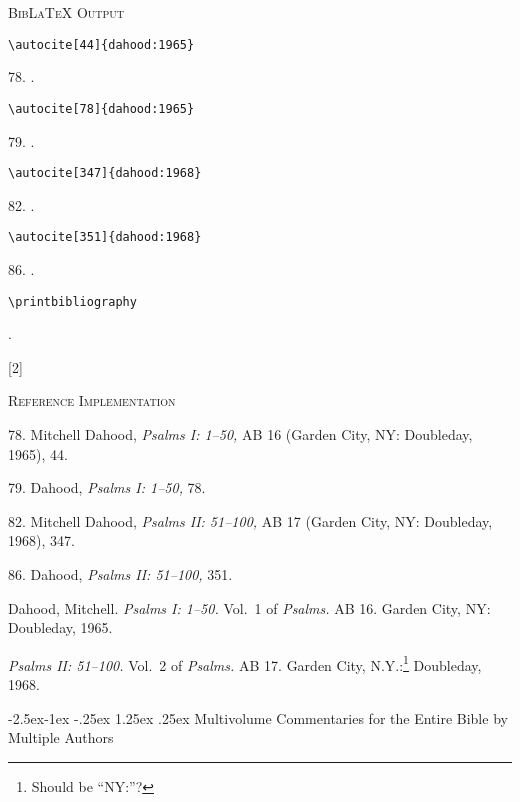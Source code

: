 \documentclass[a4paper]{article}
\makeatletter
\renewcommand\paragraph{\@startsection{paragraph}{4}{\z@}%
            {-2.5ex\@plus -1ex \@minus -.25ex}%
            {1.25ex \@plus .25ex}%
            {\normalfont\normalsize\bfseries}}
\newenvironment{refimp}{%
  \begin{minipage}{\linewidth}
    \setlength{\parskip}{1ex}
    \textsc{Reference Implementation}\par
    \nobreak
    \color{reference-colour}
}{\end{minipage}}
\makeatother
\begin{document}
{\textsc{BibLaTeX Output}\par
   \nobreak
   \texttt{\textbackslash autocite[44]\{dahood:1965\}}\par
   \color{biblatex-colour}
   78. \cite[44]{dahood:1965}.\par
   \color{black}
   \texttt{\textbackslash autocite[78]\{dahood:1965\}}\par
   \color{biblatex-colour}
   79. \cite[78]{dahood:1965}.\par
   \color{black}
   \texttt{\textbackslash autocite[347]\{dahood:1968\}}\par
   \color{biblatex-colour}
   82. \cite[347]{dahood:1968}.\par
   \color{black}
   \texttt{\textbackslash autocite[351]\{dahood:1968\}}\par
   \color{biblatex-colour}
   86. \cite[351]{dahood:1968}.\par
   \color{black}
   \texttt{\textbackslash printbibliography}\par
   \color{biblatex-colour}
   \hangindent\bibindent{}.\par
   [2]{%
     }
   \hangindent\bibindent{}\par}

\begin{refimp}
  78. Mitchell Dahood, \emph{Psalms I: 1–50,} AB 16 (Garden City, NY:
  Doubleday, 1965), 44.

  79. Dahood, \emph{Psalms I: 1–50,} 78.

  82. Mitchell Dahood, \emph{Psalms II: 51–100,} AB 17 (Garden City, NY:
  Doubleday, 1968), 347.

  86. Dahood, \emph{Psalms II: 51–100,} 351.

  \hangindent\bibindent Dahood, Mitchell. \emph{Psalms I: 1–50.} Vol.~1 of
  \emph{Psalms.} AB 16. Garden City, NY: Doubleday, 1965.

  \hangindent\bibindent\bibnamedash \emph{Psalms II: 51–100.} Vol.~2 of
  \emph{Psalms.} AB 17. Garden City, N.Y.:\footnote{Should be “NY:”?}
  Doubleday, 1968.
\end{refimp}

\paragraph{Multivolume Commentaries for the Entire Bible by Multiple Authors}
\end{document}
